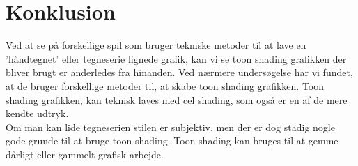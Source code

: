 \section{Konklusion}
Ved at se på forskellige spil som bruger tekniske metoder til at lave en ’håndtegnet’ eller tegneserie lignede grafik, kan vi se toon shading grafikken der bliver brugt er anderledes fra hinanden. Ved nærmere undersøgelse har vi fundet, at de bruger forskellige metoder til, at skabe toon shading grafikken. Toon shading grafikken, kan teknisk laves med cel shading, som også er en af de mere kendte udtryk. 
\\
Om man kan lide tegneserien stilen er subjektiv, men der er dog stadig nogle gode grunde til at bruge toon shading. Toon shading kan bruges til at gemme dårligt eller gammelt grafisk arbejde.